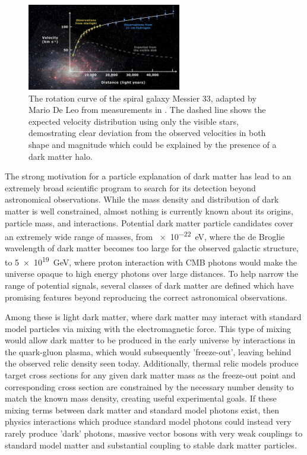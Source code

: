 \begin{figure}
   \label{fig:rotCurve}
   \centering
   \includegraphics[width=0.6\textwidth]{figures/rotation_curve.png}
   \caption[Rotation curve of Messier 33]{The rotation curve of the spiral galaxy Messier 33, adapted by Mario De Leo from measurements in \cite{Corbelli}. The dashed line shows the expected velocity distribution using only the visible stars, demostrating clear deviation from the observed velocities in both shape and magnitude which could be explained by the presence of a dark matter halo.}
\end{figure}

The strong motivation for a particle explanation of dark matter has lead to an extremely broad scientific program to search for its detection beyond astronomical observations. 
While the mass density and distribution of dark matter is well constrained, almost nothing is currently known about its origins, particle mass, and interactions.
Potential dark matter particle candidates cover an extremely wide range of masses, from \SI{e-22}{\eV}, where the de Broglie wavelength of dark matter becomes too large for the observed galactic structure, to \SI{5e19}{\giga\eV}, where proton interaction with CMB photons would make the universe opaque to high energy photons over large distances.
To help narrow the range of potential signals, several classes of dark matter are defined which have promising features beyond reproducing the correct astronomical observations. 

Among these is light dark matter, where dark matter may interact with standard model particles via mixing with the electromagnetic force. 
This type of mixing would allow dark matter to be produced in the early universe by interactions in the quark-gluon plasma, which would subsequently 'freeze-out', leaving behind the observed relic density seen today. 
Additionally, thermal relic models produce target cross sections for any given dark matter mass as the freeze-out point and corresponding cross section are constrained by the necessary number density to match the known mass density, creating useful experimental goals.
If these mixing terms between dark matter and standard model photons exist, then physics interactions which produce standard model photons could instead very rarely produce 'dark' photons, massive vector bosons with very weak couplings to standard model matter and substantial coupling to stable dark matter particles.

